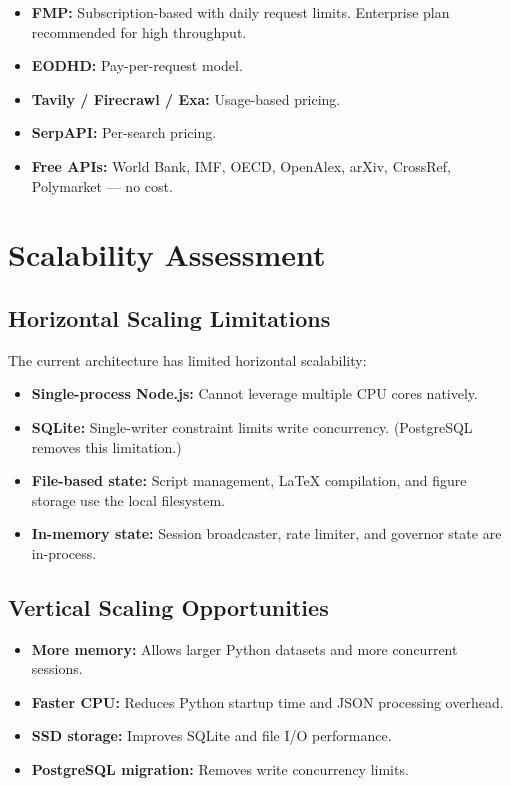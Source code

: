 \begin{itemize}
  \item \textbf{FMP:} Subscription-based with daily request limits. Enterprise plan recommended for high throughput.
  \item \textbf{EODHD:} Pay-per-request model.
  \item \textbf{Tavily / Firecrawl / Exa:} Usage-based pricing.
  \item \textbf{SerpAPI:} Per-search pricing.
  \item \textbf{Free APIs:} World Bank, IMF, OECD, OpenAlex, arXiv, CrossRef, Polymarket --- no cost.
\end{itemize}

\section{Scalability Assessment}
\label{sec:perf:scalability}

\subsection{Horizontal Scaling Limitations}

The current architecture has limited horizontal scalability:

\begin{itemize}
  \item \textbf{Single-process Node.js:} Cannot leverage multiple CPU cores natively.
  \item \textbf{SQLite:} Single-writer constraint limits write concurrency. (PostgreSQL removes this limitation.)
  \item \textbf{File-based state:} Script management, \LaTeX{} compilation, and figure storage use the local filesystem.
  \item \textbf{In-memory state:} Session broadcaster, rate limiter, and governor state are in-process.
\end{itemize}

\subsection{Vertical Scaling Opportunities}

\begin{itemize}
  \item \textbf{More memory:} Allows larger Python datasets and more concurrent sessions.
  \item \textbf{Faster CPU:} Reduces Python startup time and JSON processing overhead.
  \item \textbf{SSD storage:} Improves SQLite and file I/O performance.
  \item \textbf{PostgreSQL migration:} Removes write concurrency limits.
\end{itemize}

